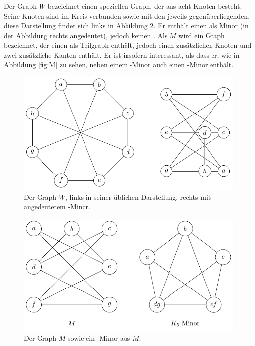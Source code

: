 Der Graph $W$ bezeichnet einen speziellen Graph, der aus acht Knoten besteht.
Seine Knoten sind im Kreis verbunden sowie mit den jeweils gegenüberliegenden, diese Darstellung findet sich links in Abbildung \ref{fig:W}.
Er enthält einen \kdd als Minor (in der Abbildung rechts angedeutet), jedoch keinen \kf.
Als $M$ wird ein Graph bezeichnet, der einen \kdd als Teilgraph enthält, jedoch einen zusätzlichen Knoten und zwei zusätzliche Kanten enthält.
Er ist insofern interessant, als dass er, wie in Abbildung \ref{fig:M} zu sehen, neben einem \kdd-Minor auch einen \kf-Minor enthält.
\begin{figure}[H]
  \centering
  \includegraphics[keepaspectratio]{bilder/W.pdf}
  \caption{Der Graph $W$, links in seiner üblichen Darstellung, rechts mit angedeutetem \kdd-Minor.}
  \label{fig:W}
\end{figure}

\begin{figure}[H]
  \centering
  \includegraphics[keepaspectratio]{bilder/M.pdf}
  \caption{Der Graph $M$ sowie ein \kf-Minor aus $M$.}
  \label{fig:W}
\end{figure}


